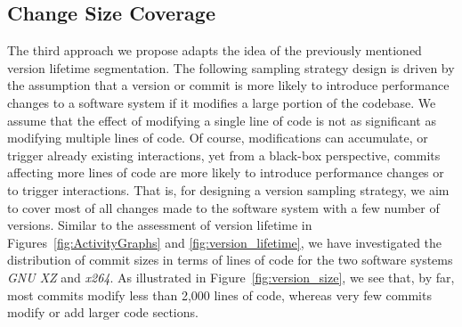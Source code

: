 \subsection{Change Size Coverage}\label{sec:changesizesampling}
The third approach we propose adapts the idea of the previously mentioned
version lifetime segmentation. The following sampling strategy design is driven
by the assumption that a version or commit is more likely to introduce
performance changes to a software system if it modifies a large portion of
the codebase. We assume that the effect of modifying a single line of code is
not as significant as modifying multiple lines of code. Of course, modifications can
accumulate, or trigger already existing interactions, yet from a black-box
perspective, commits affecting more lines of code are more likely to introduce
performance changes or to trigger interactions. That is, for designing a
version sampling strategy, we aim to cover most of all changes made to the
software system with a few number of versions. Similar to the assessment of
version lifetime in Figures~\ref{fig:ActivityGraphs} and
\ref{fig:version_lifetime}, we have investigated the distribution of commit
sizes in terms of lines of code for the two software systems \emph{GNU XZ} and
\emph{x264}. As illustrated in Figure~\ref{fig:version_size}, we see that, by far, most
commits modify less than 2,000 lines of code, whereas very few commits modify
or add larger code sections.

